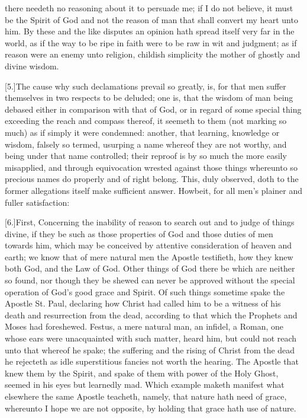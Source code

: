 there needeth no reasoning about it to persuade me; if I do not believe, it must be the Spirit of God and not the reason of man that shall convert my heart unto him. By these and the like disputes an opinion hath spread itself very far in the world, as if the way to be ripe in faith were to be raw in wit and judgment; as if reason were an enemy unto religion, childish simplicity the mother of ghostly and divine wisdom.

[5.]The cause why such declamations prevail so greatly, is, for that men suffer themselves in two respects to be deluded; one is, that the wisdom of man being debased either in comparison with that of God, or in regard of some special thing exceeding the reach and compass thereof, it seemeth to them (not marking so much) as if simply it were condemned: another, that learning, knowledge or wisdom, falsely so termed, usurping a name whereof they are not worthy, and being  under that name controlled; their reproof is by so much the more easily misapplied, and through equivocation wrested against those things whereunto so precious names do properly and of right belong. This, duly observed, doth to the former allegations itself make sufficient answer. Howbeit, for all men’s plainer and fuller satisfaction:

[6.]First, Concerning the inability of reason to search out and to judge of things divine, if they be such as those properties of God and those duties of men towards him, which may be conceived by attentive consideration of heaven and earth; we know that of mere natural men the Apostle testifieth, how they knew both God, and the Law of God. Other things of God there be which are neither so found, nor though they be shewed can never be approved without the special operation of God’s good grace and Spirit. Of such things sometime spake the Apostle St. Paul, declaring how Christ had called him to be a witness of his death and resurrection from the dead, according to that which the Prophets and Moses had foreshewed. Festus, a mere natural man, an infidel, a Roman, one whose ears were unacquainted with such matter, heard him, but could not reach unto that whereof he spake; the suffering and the rising of Christ from the dead he rejecteth as idle superstitious fancies not worth the hearing. The Apostle that knew them by the Spirit, and spake of them with power of the Holy Ghost, seemed in his eyes but learnedly mad. Which example maketh manifest what elsewhere the same Apostle teacheth, namely, that nature hath need of grace, whereunto I hope we are not opposite, by holding that grace hath use of nature.

